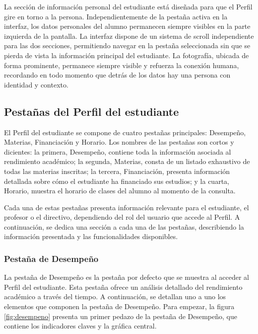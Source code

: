 La sección de información personal del estudiante está diseñada para que el Perfil gire en torno a la persona. Independientemente de la pestaña activa en la interfaz, los datos personales del alumno permanecen siempre visibles en la parte izquierda de la pantalla. La interfaz dispone de un sistema de scroll independiente para las dos secciones, permitiendo navegar en la pestaña seleccionada sin que se pierda de vista la información principal del estudiante. La fotografía, ubicada de forma prominente, permanece siempre visible y refuerza la conexión humana, recordando en todo momento que detrás de los datos hay una persona con identidad y contexto.

\subsection{Pestañas del Perfil del estudiante}

El Perfil del estudiante se compone de cuatro pestañas principales: Desempeño, Materias, Financiación y Horario. Los nombres de las pestañas son cortos y dicientes: la primera, Desempeño, contiene toda la información asociada al rendimiento académico; la segunda, Materias, consta de un listado exhaustivo de todas las materias inscritas; la tercera, Financiación, presenta información detallada sobre cómo el estudiante ha financiado sus estudios; y la cuarta, Horario, muestra el horario de clases del alumno al momento de la consulta.

Cada una de estas pestañas presenta información relevante para el estudiante, el profesor o el directivo, dependiendo del rol del usuario que accede al Perfil. A continuación, se dedica una sección a cada una de las pestañas, describiendo la información presentada y las funcionalidades disponibles.

\subsubsection{Pestaña de Desempeño}

La pestaña de Desempeño es la pestaña por defecto que se muestra al acceder al Perfil del estudiante. Esta pestaña ofrece un análisis detallado del rendimiento académico a través del tiempo. A continuación, se detallan uno a uno los elementos que componen la pestaña de Desempeño. Para empezar, la figura \ref{fig:desempeno} presenta un primer pedazo de la pestaña de Desempeño, que contiene los indicadores claves y la gráfica central.

